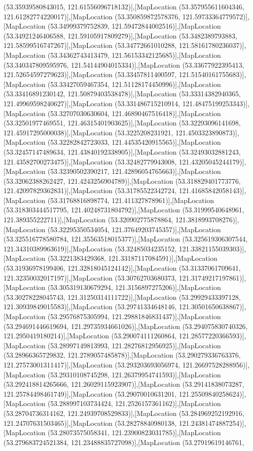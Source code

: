 (53.35939580843015, 121.61556096718132)],[MapLocation (53.357955611604346, 121.61282774220017)],[MapLocation (53.350859872578376, 121.59733364779572)],[MapLocation (53.34999379752839, 121.59472844002516)],[MapLocation (53.34921246406588, 121.59105917809279)],[MapLocation (53.3482389793883, 121.58599516747267)],[MapLocation (53.34772661010288, 121.58161780236037)],[MapLocation (53.34362743413479, 121.56153342125685)],[MapLocation (53.340347809595976, 121.54144904015334)],[MapLocation (53.33677922395413, 121.52654597279623)],[MapLocation (53.33457811400597, 121.51540161755683)],[MapLocation (53.33427059467354, 121.51128174450996)],[MapLocation (53.33416891230142, 121.50879403538478)],[MapLocation (53.33314382940365, 121.49969598240627)],[MapLocation (53.331486715210914, 121.48475199253343)],[MapLocation (53.32707030630604, 121.46890467516418)],[MapLocation (53.32501977469551, 121.46315401903625)],[MapLocation (53.32293096141698, 121.45917295000038)],[MapLocation (53.3225208231921, 121.4503323890873)],[MapLocation (53.32282842723033, 121.44535420915565)],[MapLocation (53.32457147489634, 121.43840192338905)],[MapLocation (53.32493032881243, 121.43582700273475)],[MapLocation (53.32482779943008, 121.43205045244179)],[MapLocation (53.32390502390217, 121.42896054765663)],[MapLocation (53.32062388262427, 121.4243256904789)],[MapLocation (53.318829401773776, 121.42097829362831)],[MapLocation (53.31785522342724, 121.41685842058143)],[MapLocation (53.31768816898774, 121.411327878961)],[MapLocation (53.318303444517795, 121.40248731804792)],[MapLocation (53.31999540648961, 121.389355222711)],[MapLocation (53.320902775878864, 121.3818993708276)],[MapLocation (53.32295350534054, 121.37649203745357)],[MapLocation (53.325516778580784, 121.35563518015377)],[MapLocation (53.325619306307544, 121.34310389963619)],[MapLocation (53.32485034235152, 121.33821155039303)],[MapLocation (53.3221383429368, 121.33187117084591)],[MapLocation (53.31936978199406, 121.32818045124142)],[MapLocation (53.31337061709641, 121.32350032017197)],[MapLocation (53.30762703680373, 121.31749217197861)],[MapLocation (53.305319130679294, 121.3156897275206)],[MapLocation (53.30278228045743, 121.31250314111722)],[MapLocation (53.29929433397128, 121.30939849015583)],[MapLocation (53.29741334648146, 121.30501650638867)],[MapLocation (53.29576875305994, 121.29881846831437)],[MapLocation (53.294691446619694, 121.29735934661026)],[MapLocation (53.294075830740326, 121.2950419180214)],[MapLocation (53.290074111260864, 121.28577220366593)],[MapLocation (53.28997149813993, 121.28276812956925)],[MapLocation (53.28966365729832, 121.2789057485878)],[MapLocation (53.290279336763376, 121.27573001311417)],[MapLocation (53.293203693056974, 121.26697528288956)],[MapLocation (53.29310108745298, 121.26379954741593)],[MapLocation (53.292418814265666, 121.26029115923907)],[MapLocation (53.29141838073287, 121.25784498461749)],[MapLocation (53.29070010631201, 121.25509840258624)],[MapLocation (53.288997103734424, 121.2526157361162)],[MapLocation (53.28704736314162, 121.24939708529833)],[MapLocation (53.284969252192916, 121.24707631503465)],[MapLocation (53.28278840980138, 121.24381474887254)],[MapLocation (53.28073575058341, 121.23900823031785)],[MapLocation (53.279683724521384, 121.23488835727098)],[MapLocation (53.27919619146761, 